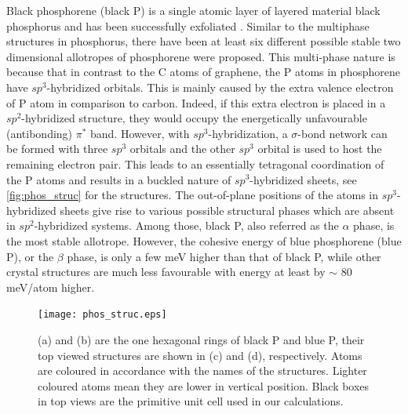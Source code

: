 Black phosphorene (black P) is a single atomic layer of layered material black phosphorus and has been successfully exfoliated \cite{Han2014,Li2014a}. Similar to the multiphase structures in phosphorus, there have been at least six different possible stable two dimensional allotropes of phosphorene were proposed\cite{Zhu2014,Guan2014a,Wu2015}. This multi-phase nature is because that in contrast to the C atoms of graphene, the P atoms in phosphorene have $sp^3$-hybridized orbitals. This is mainly caused by the extra valence electron of P atom in comparison to carbon. Indeed, if this extra electron is placed in a $sp^2$-hybridized structure, they would occupy the energetically unfavourable (antibonding) $\pi^*$ band. However, with $sp^3$-hybridization, a $\sigma$-bond network can be formed with three $sp^3$ orbitals and the other $sp^3$ orbital is used to host the remaining electron pair. This leads to an essentially tetragonal coordination of the P atoms and results in a buckled nature of $sp^3$-hybridized sheets, see \autoref{fig:phos_struc} for the structures. The out-of-plane positions of the atoms in $sp^3$-hybridized sheets give rise to various possible structural phases which are absent in $sp^2$-hybridized systems. Among those, black P, also referred as the $\alpha$ phase, is the most stable allotrope. However, the cohesive energy of blue phosphorene (blue P), or the $\beta$ phase, is only a few meV higher than that of black P, while other crystal structures are much less favourable with energy at least by $\sim$ 80 meV/atom higher.  

\begin{figure}[htbp] 
\centering
\texttt{[image: phos\_struc.eps]}%
\caption[Black and blue phosphorene structures]{(a) and (b) are the one hexagonal rings of black P and blue P, their top viewed structures are shown in (c) and (d), respectively. Atoms are coloured in accordance with the names of the structures. Lighter coloured atoms mean they are lower in vertical position. Black boxes in top views are the primitive unit cell used in our calculations. }
\label{fig:phos_struc}
\end{figure}

